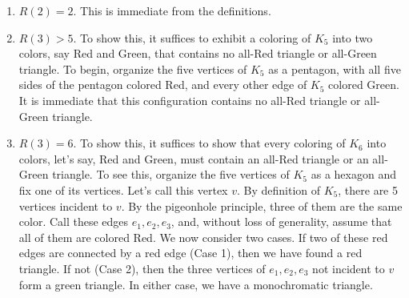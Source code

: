 \begin{examples}\hfill
\begin{enumerate}
\item
$R(2)=2$. This is immediate from the definitions.

\item
$R(3)>5$. To show this, it suffices to exhibit a coloring of $K_5$ into two colors, say Red and Green, that contains no all-Red triangle or all-Green triangle. To begin, organize the five vertices of $K_5$ as a pentagon, with all five sides of the pentagon colored Red, and every other edge of $K_5$ colored Green. It is immediate that this configuration contains no  all-Red triangle or all-Green triangle.

\begin{figure}[h!]
\centering
{}
\end{figure}

\item
$R(3)=6$. To show this, it suffices to  show that every coloring of $K_6$ into colors, let's say, Red and Green, must contain an all-Red triangle or an all-Green triangle. To see this, organize the five vertices of $K_5$ as a hexagon and fix one of its vertices. Let's call this vertex $v$. By definition of $K_5$, there are 5 vertices incident to $v$. By the pigeonhole principle, three of them are the same color. Call these edges $e_1, e_2, e_3$, and, without loss of generality, assume that all of them are colored Red. We now consider two cases. If two of these red edges are connected by a red edge (Case 1), then we have found a red triangle. If not (Case 2), then the three vertices of $e_1, e_2, e_3$ not incident to $v$ form a green triangle. In either case, we have a monochromatic triangle.

\begin{figure}[h!]
\centering
{}
\end{figure}
\end{enumerate}
\end{examples}
